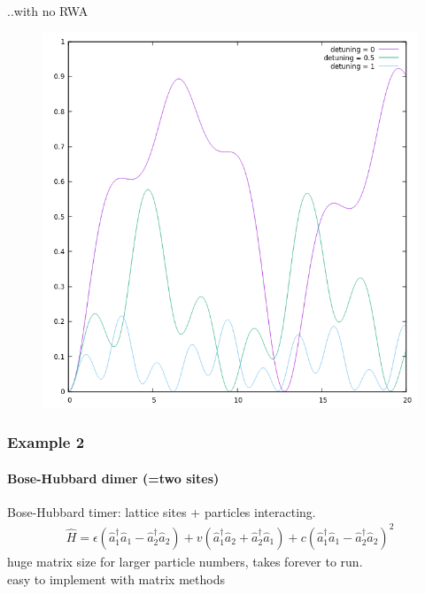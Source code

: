 \documentclass{beamer}
\begin{document}
\begin{frame}
..with no RWA
\begin{figure}
\includegraphics[scale=0.45]{detuningsnorwa.png}
\end{figure}
\end{frame}
\begin{frame}[fragile]
\frametitle{Example 2}
\framesubtitle{Bose-Hubbard dimer (=two sites)}
Bose-Hubbard timer: lattice sites + particles interacting.
\begin{align}
\hat{H} = \epsilon (\hat{a}_1^\dagger \hat{a}_1-\hat{a}_2^\dagger\hat{a}_2) + v (\hat{a}_1^\dagger\hat{a}_2 + \hat{a}_2^\dagger\hat{a}_1) + c(\hat{a}_1^\dagger\hat{a}_1 - \hat{a}_2^\dagger\hat{a}_2)^2
\end{align}
huge matrix size for larger particle numbers, takes forever to run.\\
easy to implement with matrix methods
\end{frame}
\end{document}
